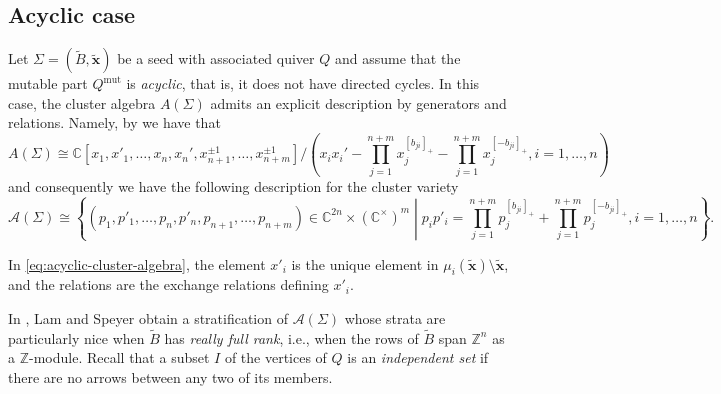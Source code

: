 \documentclass{amsart}
\newcommand{\seed}{\Sigma}
\newcommand{\excluster}[1]{\widetilde{\mathbf{#1}}}
\newcommand{\mut}{\mathrm{mut}}
\newcommand{\exmatrix}[1]{\widetilde{#1}}
\newcommand{\var}{\mathcal{A}}
\newcommand{\C}{\mathbb{C}}
\newcommand{\Z}{\mathbb{Z}}
\numberwithin{equation}{section}
\theoremstyle{definition}
\begin{document}
\subsection{Acyclic case}\label{sec:acyclic}
Let $\seed = (\exmatrix{B}, \excluster{x})$ be a seed with associated quiver $Q$ and assume that the mutable part $Q^{\mut}$ is \emph{acyclic}, that is, it does not have directed cycles. 
In this case, the cluster algebra $A(\seed)$ admits an explicit description by generators and relations. Namely, by \cite[Corollary 1.21]{BFZ} we have that 
\begin{equation}\label{eq:acyclic-cluster-algebra}
A(\seed) \cong \C[x_1, x'_1, \dots, x_n, x_n', x_{n+1}^{\pm1}, \dots, x_{n+m}^{\pm1}]\Big/\left(x_ix_i' - \prod_{j = 1}^{n+m}x_{j}^{[b_{ji}]_{+}} - \prod_{j = 1}^{n+m}x_j^{[-b_{ji}]_{+}}, i = 1, \dots, n\right)
\end{equation}
and consequently we have the following description for the cluster variety
\begin{equation}\label{eq:acyclic-cluster-variety}
\var(\seed)\! \cong \!\left\{\!(p_1, p'_1, \dots, p_n, p'_n, p_{n+1}, \dots, p_{n+m})\! \in\! \C^{2n} \!\times \! (\C^{\times})^{m} \middle| p_ip'_i \!=\! \prod_{j = 1}^{n+m}p_{j}^{[b_{ji}]_{+}} \!\!+\!\! \prod_{j = 1}^{n+m}p_j^{[-b_{ji}]_{+}}\!, i = 1, \dots, n\! \right\}.
\end{equation}

    In \eqref{eq:acyclic-cluster-algebra}, the element $x'_i$ is the unique element in $\mu_i(\excluster{x}) \setminus \excluster{x}$, and the relations are the exchange relations defining $x'_i$. 

    In \cite[Section 3]{LSII}, Lam and Speyer obtain a stratification of $\var(\seed)$ whose strata are particularly nice when $\exmatrix{B}$ has \emph{really full rank}, i.e., when the rows of $\exmatrix{B}$ span $\Z^n$ as a $\Z$-module. Recall that a subset $I$ of the vertices of $Q$ is an \emph{independent set} if there are no arrows between any two of its members. 
\end{document}
